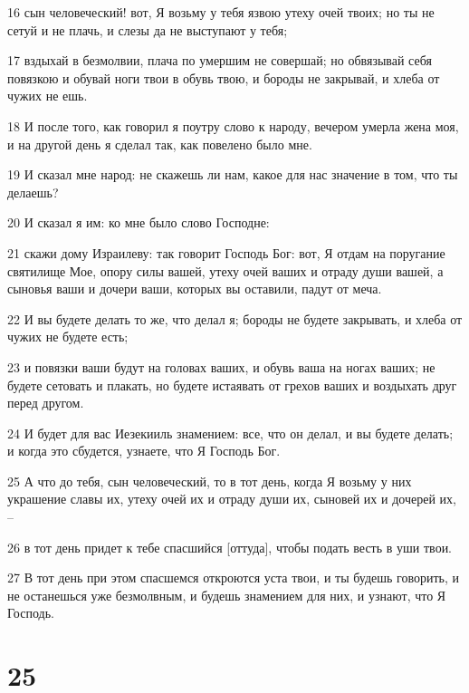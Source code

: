 \par 16 сын человеческий! вот, Я возьму у тебя язвою утеху очей твоих; но ты не сетуй и не плачь, и слезы да не выступают у тебя;
\par 17 вздыхай в безмолвии, плача по умершим не совершай; но обвязывай себя повязкою и обувай ноги твои в обувь твою, и бороды не закрывай, и хлеба от чужих не ешь.
\par 18 И после того, как говорил я поутру слово к народу, вечером умерла жена моя, и на другой день я сделал так, как повелено было мне.
\par 19 И сказал мне народ: не скажешь ли нам, какое для нас значение в том, что ты делаешь?
\par 20 И сказал я им: ко мне было слово Господне:
\par 21 скажи дому Израилеву: так говорит Господь Бог: вот, Я отдам на поругание святилище Мое, опору силы вашей, утеху очей ваших и отраду души вашей, а сыновья ваши и дочери ваши, которых вы оставили, падут от меча.
\par 22 И вы будете делать то же, что делал я; бороды не будете закрывать, и хлеба от чужих не будете есть;
\par 23 и повязки ваши будут на головах ваших, и обувь ваша на ногах ваших; не будете сетовать и плакать, но будете истаявать от грехов ваших и воздыхать друг перед другом.
\par 24 И будет для вас Иезекииль знамением: все, что он делал, и вы будете делать; и когда это сбудется, узнаете, что Я Господь Бог.
\par 25 А что до тебя, сын человеческий, то в тот день, когда Я возьму у них украшение славы их, утеху очей их и отраду души их, сыновей их и дочерей их, --
\par 26 в тот день придет к тебе спасшийся [оттуда], чтобы подать весть в уши твои.
\par 27 В тот день при этом спасшемся откроются уста твои, и ты будешь говорить, и не останешься уже безмолвным, и будешь знамением для них, и узнают, что Я Господь.

\chapter{25}

